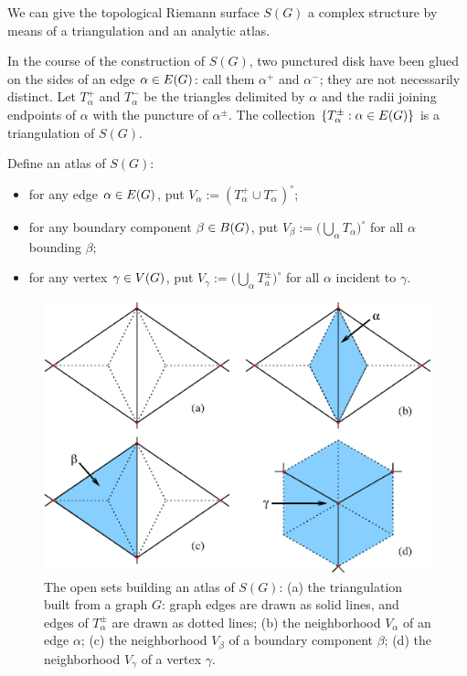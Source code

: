 We can give the topological Riemann surface $S(G)$ a complex
structure by means of a triangulation and an analytic atlas.

In the course of the construction of $S(G)$, two punctured disk have
been glued on the sides of an edge $\alpha \in E(G)$: call them $\alpha^+$
and $\alpha^-$; they are not necessarily distinct.  Let $T_\alpha^+$ and $T_\alpha^-$
be the triangles delimited by $\alpha$ and the radii joining endpoints of
$\alpha$ with the puncture of $\alpha^\pm$. The collection $\{T_\alpha^\pm : \alpha \in
E(G)\}$ is a triangulation of $S(G)$.

Define an atlas of $S(G)$:
\begin{itemize}
\item for any edge $\alpha \in E(G)$, put $V_\alpha := (T_\alpha^+ \cup T_\alpha^-)^\circ$;
\item for any boundary component $\beta \in B(G)$, put $V_\beta := \bigl(
  \bigcup_{\alpha} T_\alpha \bigr)^\circ$ for all $\alpha$ bounding $\beta$;
\item for any vertex $\gamma \in V(G)$, put $V_\gamma := \bigl( \bigcup_\alpha T_a^\pm
  \bigr)^\circ$ for all $\alpha$ incident to $\gamma$.
\end{itemize}
\begin{figure}[btp]
  \centering\includegraphics[width=\textwidth]{atlas}
  \caption{The open sets building an atlas of $S(G)$: (a) the
    triangulation built from a graph $G$: graph edges are drawn as
    solid lines, and edges of $T_\alpha^{\pm}$ are drawn as dotted lines; (b)
    the neighborhood $V_\alpha$ of an edge $\alpha$; (c) the neighborhood $V_\beta$
    of a boundary component $\beta$; (d) the neighborhood $V_\gamma$ of a
    vertex $\gamma$.}
  \label{fig:atlas}
\end{figure}

